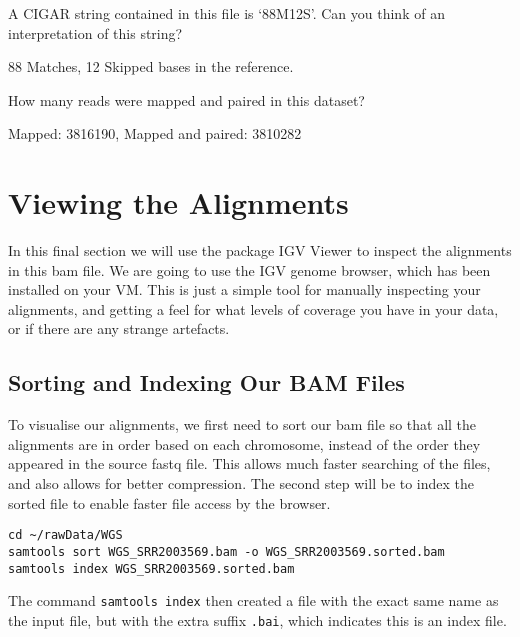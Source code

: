 \begin{questions}
A CIGAR string contained in this file is `88M12S'.
Can you think of an interpretation of this string? \\
\begin{answer}
88 Matches, 12 Skipped bases in the reference.
\end{answer}
How many reads were mapped and paired in this dataset?
\begin{answer}
Mapped: 3816190, Mapped and paired: 3810282
\end{answer}
\end{questions}

\section{Viewing the Alignments}
In this final section we will use the package IGV Viewer to inspect the alignments in this bam file.
We are going to use the IGV genome browser, which has been installed on your VM.
This is just a simple tool for manually inspecting your alignments, and getting a feel for what levels of coverage you have in your data, or if there are any strange artefacts.

\subsection{Sorting and Indexing Our BAM Files}
\begin{note}
To visualise our alignments, we first need to sort our bam file so that all the alignments are in order based on each chromosome, instead of the order they appeared in the source fastq file.
This allows much faster searching of the files, and also allows for better compression.
The second step will be to index the sorted file to enable faster file access by the browser.
\end{note}

\begin{steps}
\begin{lstlisting}
cd ~/rawData/WGS
samtools sort WGS_SRR2003569.bam -o WGS_SRR2003569.sorted.bam
samtools index WGS_SRR2003569.sorted.bam
\end{lstlisting}
\end{steps}

The command \texttt{samtools index} then created a file with the exact same name as the input file, but with the extra suffix \texttt{.bai}, which indicates this is an index file.\\

